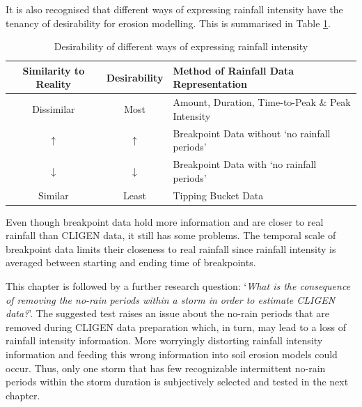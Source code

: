 It is also recognised that different ways of expressing rainfall intensity have
the tenancy of desirability for erosion modelling. This is summarised in Table
\ref{tab:DesirabilityOfDifferentWaysOfExpressingRainfallIntensity}.

\begin{table}[htbp]
  \small
  \centering
      \caption{Desirability of different ways of expressing rainfall intensity}
  \label{tab:DesirabilityOfDifferentWaysOfExpressingRainfallIntensity}
    \begin{tabular}{ccl}
    \toprule
    Similarity to Reality & Desirability & Method of Rainfall Data
Representation\\
    \midrule
    Dissimilar & Most & Amount, Duration, Time-to-Peak \& Peak Intensity\\
    $\uparrow$ & $\uparrow$ &  Breakpoint Data without `no rainfall periods'\\
    $\downarrow$ & $\downarrow$ &  Breakpoint Data with `no rainfall periods'\\
    Similar & Least & Tipping Bucket Data\\
    \bottomrule
    \end{tabular}
\end{table}

Even though breakpoint data hold more information and are closer to real
rainfall than CLIGEN data, it still has some problems. The temporal scale of
breakpoint data limits their closeness to real rainfall since rainfall intensity
is averaged between starting and ending time of breakpoints.

This chapter is followed by a further research question: `\textit{What is the
consequence of removing the no-rain periods within a storm in order to estimate
CLIGEN data?}'.
The suggested test raises an issue about the no-rain periods that are removed
during CLIGEN data preparation which, in turn, may lead to a loss of rainfall
intensity information. More worryingly distorting rainfall intensity information
and feeding this wrong information into soil erosion models could occur. Thus,
only one storm that has few recognizable intermittent no-rain periods within the
storm duration is subjectively selected and tested in the next chapter.




